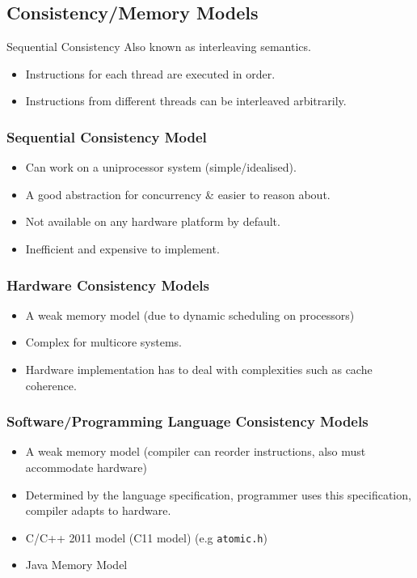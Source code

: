 \subsection{Consistency/Memory Models}
\begin{definitionbox}{Sequential Consistency}
	Also known as interleaving semantics.
	\begin{itemize}
		\item Instructions for each thread are executed in order.
		\item Instructions from different threads can be interleaved arbitrarily.
	\end{itemize}
\end{definitionbox}
\subsubsection{Sequential Consistency Model}
\begin{itemize}
	\item Can work on a uniprocessor system (simple/idealised).
	\item A good abstraction for concurrency \& easier to reason about.
	\item Not available on any hardware platform by default.
	\item Inefficient and expensive to implement.
\end{itemize}
\subsubsection{Hardware Consistency Models}
\begin{itemize}
	\item A weak memory model (due to dynamic scheduling on processors)
	\item Complex for multicore systems.
	\item Hardware implementation has to deal with complexities such as cache coherence.
\end{itemize}
\subsubsection{Software/Programming Language Consistency Models}
\begin{itemize}
	\item A weak memory model (compiler can reorder instructions, also must accommodate hardware)
	\item Determined by the language specification, programmer uses this specification, compiler adapts to hardware.
	\item C/C++ 2011 model (C11 model) (e.g \texttt{atomic.h})
	\item Java Memory Model
\end{itemize}


